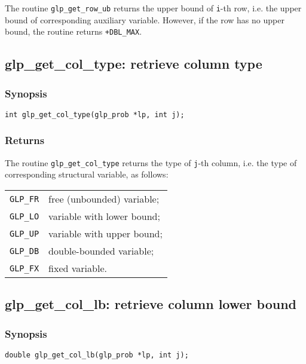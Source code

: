 The routine \verb|glp_get_row_ub| returns the upper bound of
\verb|i|-th row, i.e. the upper bound of corresponding auxiliary
variable. However, if the row has no upper bound, the routine returns
\verb|+DBL_MAX|.

\subsection{glp\_get\_col\_type: retrieve column type}

\subsubsection*{Synopsis}

\begin{verbatim}
int glp_get_col_type(glp_prob *lp, int j);
\end{verbatim}

\subsubsection*{Returns}

The routine \verb|glp_get_col_type| returns the type of \verb|j|-th
column, i.e. the type of corresponding structural variable, as follows:

\begin{tabular}{@{}ll}
\verb|GLP_FR| & free (unbounded) variable; \\
\verb|GLP_LO| & variable with lower bound; \\
\verb|GLP_UP| & variable with upper bound; \\
\verb|GLP_DB| & double-bounded variable; \\
\verb|GLP_FX| & fixed variable. \\
\end{tabular}

\subsection{glp\_get\_col\_lb: retrieve column lower bound}

\subsubsection*{Synopsis}

\begin{verbatim}
double glp_get_col_lb(glp_prob *lp, int j);
\end{verbatim}

